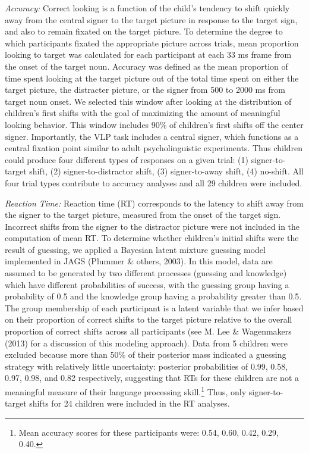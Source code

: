 \documentclass[12pt,]{article}
\let\rmarkdownfootnote\footnote%
\def\footnote{\protect\rmarkdownfootnote}
\begin{document}
\emph{Accuracy:} Correct looking is a function of the child's tendency
to shift quickly away from the central signer to the target picture in
response to the target sign, and also to remain fixated on the target
picture. To determine the degree to which participants fixated the
appropriate picture across trials, mean proportion looking to target was
calculated for each participant at each 33 ms frame from the onset of
the target noun. Accuracy was defined as the mean proportion of time
spent looking at the target picture out of the total time spent on
either the target picture, the distracter picture, or the signer from
500 to 2000 ms from target noun onset. We selected this window after
looking at the distribution of children's first shifts with the goal of
maximizing the amount of meaningful looking behavior. This window
includes 90\% of children's first shifts off the center signer.
Importantly, the VLP task includes a central signer, which functions as
a central fixation point similar to adult psycholinguistic experiments.
Thus children could produce four different types of responses on a given
trial: (1) signer-to-target shift, (2) signer-to-distractor shift, (3)
signer-to-away shift, (4) no-shift. All four trial types contribute to
accuracy analyses and all 29 children were included.

\emph{Reaction Time:} Reaction time (RT) corresponds to the latency to
shift away from the signer to the target picture, measured from the
onset of the target sign. Incorrect shifts from the signer to the
distractor picture were not included in the computation of mean RT. To
determine whether children's initial shifts were the result of guessing,
we applied a Bayesian latent mixture guessing model implemented in JAGS
(Plummer \& others, 2003). In this model, data are assumed to be
generated by two different processes (guessing and knowledge) which have
different probabilities of success, with the guessing group having a
probability of 0.5 and the knowledge group having a probability greater
than 0.5. The group membership of each participant is a latent variable
that we infer based on their proportion of correct shifts to the target
picture relative to the overall proportion of correct shifts across all
participants (see M. Lee \& Wagenmakers (2013) for a discussion of this
modeling approach). Data from 5 children were excluded because more than
50\% of their posterior mass indicated a guessing strategy with
relatively little uncertainty: posterior probabilities of 0.99, 0.58,
0.97, 0.98, and 0.82 respectively, suggesting that RTs for these
children are not a meaningful measure of their language processing
skill.\footnote{Mean accuracy scores for these participants were: 0.54,
  0.60, 0.42, 0.29, 0.40.} Thus, only signer-to-target shifts for 24
children were included in the RT analyses.
\end{document}
